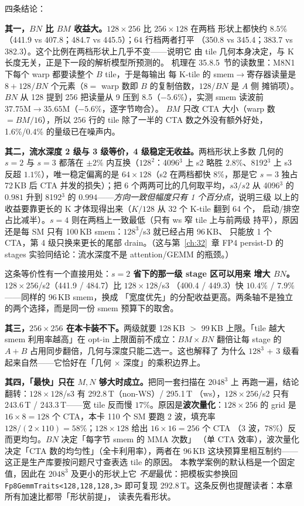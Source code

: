 四条结论：

\textbf{其一，$BN$ 比 $BM$ 收益大。}$128\times256$ 比 $256\times128$ 在两档
形状上都快约 $8.5\%$（441.9 vs 407.8；484.7 vs 445.5）；$64$ 行档两者打平
（350.8 vs 345.4；383.7 vs 382.3）。这个比例在两档形状上几乎不变——说明它
由 tile 几何本身决定，与 K 长度无关，正是下一段的解析模型所预测的。
机理在 35.8.5~节的读数里：M8N1 下每个 warp 都要读整个 $B$ tile，于是每输出
每 K-tile 的 smem$\to$寄存器读量是
$8 + 128/BN$ 个元素（$8=$ warp 数即 $B$ 的复制倍数，$128/BN$ 是 $A$ 侧
摊销项）。$BN$ 从 128 提到 256 把读量从 9 压到 8.5（$-5.6\%$），实测
smem 读波前 $37.75\text{M}\to35.65\text{M}$（$-5.6\%$，逐字节吻合）。
$BM$ 只改 CTA 大小（warp 数 $=BM/16$），所以 $256$ 行的 tile 除了一半的
CTA 数之外没有额外好处，1.6\%/0.4\% 的量级已在噪声内。

\textbf{其二，流水深度 2 级与 3 级等价，4 级稳定无收益。}两档形状上多数
几何的 $s{=}2$ 与 $s{=}3$ 都落在 $\pm2\%$ 内互换（$128^2$：4096$^3$ 上
s2 略胜 $2.8\%$、8192$^3$ 上 s3 反超 $1.1\%$），唯一稳定偏离的是
$64\times128$（s2 在两档都快 $8\%$，那是它 $s{=}3$ 独占 72\,KB 后 CTA
并发的损失）；把 6 个两两可比的几何取平均，$s3/s2$ 从 4096$^3$ 的 $0.981$
升到 8192$^3$ 的 $0.994$——\emph{方向一致但幅度只有 1 个百分点}，说明三级
以上的收益要靠更长的 K 才体现得出来（$K/128$ 从 32 个 K-tile 翻到 64 个，
启动/排空占比减半）。$s{=}4$ 则在两档上一致最低（只有 ws 窄 tile 上与前两级
持平），原因还是每 SM 只有 100\,KB smem：$128^3$/s3 就已经占用 96\,KB、
只能放 1 个 CTA，第 4 级只换来更长的尾部 drain。（这与第~\ref{ch:32}~章
FP4 persist-D 的 stages 实验同结论：流水深度不是 attention/GEMM 的瓶颈。）

这条等价性有一个直接用处：\textbf{$s{=}2$ 省下的那一级 stage 区可以用来
增大 $BN$。}$128\times256$/s2（441.9 / 484.7）比 $128\times128$/s3
（400.4 / 449.3）快 $10.4\%$ / $7.9\%$——同样的 96\,KB smem，换成
「宽度优先」的分配收益更高。两条轴不是独立的两个选择，而是同一份 smem
预算下的取舍。

\textbf{其三，$256\times256$ 在本卡装不下。}两级就要 128\,KB $>$ 99\,KB
上限。「tile 越大 smem 利用率越高」在 opt-in 上限面前不成立：$BM\times BN$
翻倍让每 stage 的 $A+B$ 占用同步翻倍，几何与深度只能二选一。这也解释了
为什么 $128^3$ + 3 级看起来自然——它恰好在「几何 $\times$ 深度」的乘积边界上。

\textbf{其四，「最快」只在 $M,N$ 够大时成立。}把同一套扫描在 $2048^3$ 上
再跑一遍，结论翻转：$128\times128$/s3 有 292.8\,T（non-WS）/ 295.1\,T
（ws），$128\times256$/s2 只有 243.6\,T / 243.3\,T——宽 tile 反而慢
$17\%$。原因是\textbf{波次量化}：$128\times256$ 的 grid 是
$16\times8=128$ 个 CTA，本卡 110 个 SM 要跑 2 波，填充率
$128/(2\times110)=58\%$；$128\times128$ 给出 $16\times16=256$ 个 CTA
（3 波，$78\%$）反而更均匀。$BN$ 决定「每字节 smem 的 MMA 次数」
（单 CTA 效率），波次量化决定「CTA 数的均匀性」（全卡利用率），两者在
96\,KB 这块预算里相互制约——这正是生产库要按问题尺寸查表选 tile 的原因。
本教学案例的默认档是一个固定值，因此在 $2048^3$ 及更小的形状上它
\emph{不是}最优：把模板实参换回 \texttt{Fp8GemmTraits<128,128,128,3>}
即可复现 292.8\,T。这条反例也提醒读者：本章所有加速比都带「形状前提」，
读表先看形状。

